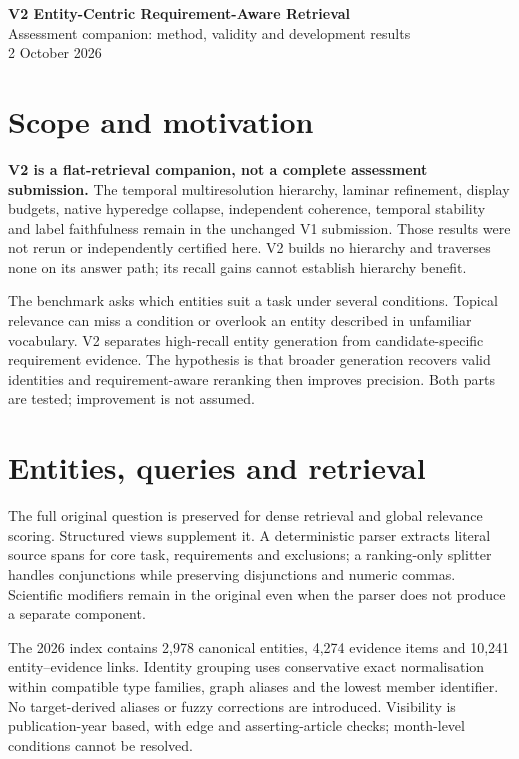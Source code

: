 \documentclass[11pt,a4paper]{article}
\begin{document}
\begin{center}
{\Large\bfseries V2 Entity-Centric Requirement-Aware Retrieval}\\[2mm]
{Assessment companion: method, validity and development results}\\
{2 October 2026}
\end{center}
\section*{Scope and motivation}
\textbf{V2 is a flat-retrieval companion, not a complete assessment submission.} The temporal multiresolution hierarchy, laminar refinement, display budgets, native hyperedge collapse, independent coherence, temporal stability and label faithfulness remain in the unchanged V1 submission. Those results were not rerun or independently certified here. V2 builds no hierarchy and traverses none on its answer path; its recall gains cannot establish hierarchy benefit.

The benchmark asks which entities suit a task under several conditions. Topical relevance can miss a condition or overlook an entity described in unfamiliar vocabulary. V2 separates high-recall entity generation from candidate-specific requirement evidence. The hypothesis is that broader generation recovers valid identities and requirement-aware reranking then improves precision. Both parts are tested; improvement is not assumed.

\section*{Entities, queries and retrieval}
The full original question is preserved for dense retrieval and global relevance scoring. Structured views supplement it. A deterministic parser extracts literal source spans for core task, requirements and exclusions; a ranking-only splitter handles conjunctions while preserving disjunctions and numeric commas. Scientific modifiers remain in the original even when the parser does not produce a separate component.

The 2026 index contains 2,978 canonical entities, 4,274 evidence items and 10,241 entity--evidence links. Identity grouping uses conservative exact normalisation within compatible type families, graph aliases and the lowest member identifier. No target-derived aliases or fuzzy corrections are introduced. Visibility is publication-year based, with edge and asserting-article checks; month-level conditions cannot be resolved.
\end{document}

